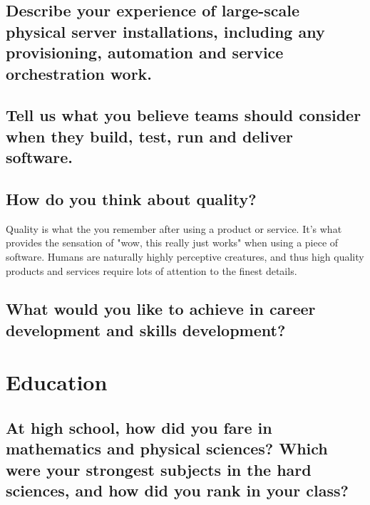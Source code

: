 \documentclass{article}
\begin{document}
\subsection{Describe your experience of large-scale physical server
    installations, including any provisioning, automation and service orchestration
    work.}
\subsection{Tell us what you believe teams should consider when they build,
    test, run and deliver software.}
\subsection{How do you think about quality?}

Quality is what the you remember after using a product or service. It's what
provides the sensation of "wow, this really just works" when using a piece of
software. Humans are naturally highly perceptive creatures, and thus high
quality products and services require lots of attention to the finest details.


\subsection{What would you like to achieve in career development and skills
    development?}

\section{Education}
\subsection{At high school, how did you fare in mathematics
    and physical sciences? Which were your strongest subjects in the hard sciences,
    and how did you rank in your class?}
\end{document}
